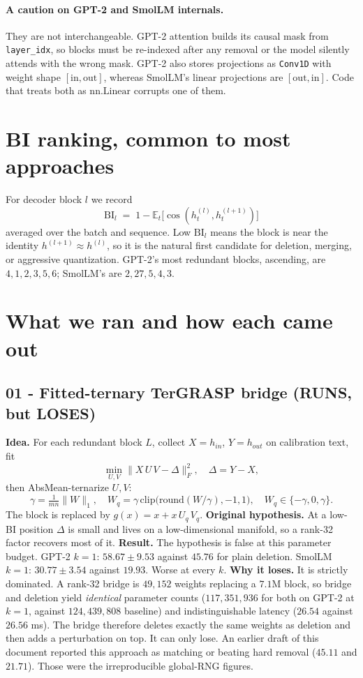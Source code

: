 \documentclass[11pt]{article}
\begin{document}
\paragraph{A caution on GPT-2 and SmolLM internals.} They are not
interchangeable. GPT-2 attention builds its causal mask from
\texttt{layer\_idx}, so blocks must be re-indexed after any removal or the
model silently attends with the wrong mask. GPT-2 also stores projections as
\texttt{Conv1D} with weight shape $[\text{in},\text{out}]$, whereas SmolLM's
linear projections are $[\text{out},\text{in}]$. Code that treats both as
$\mathrm{nn.Linear}$ corrupts one of them.

\section{BI ranking, common to most approaches} \label{sec:bi}
For decoder block $l$ we record
\[
\mathrm{BI}_l \;=\; 1 - \mathbb{E}_{t}\big[\cos(h^{(l)}_t, h^{(l+1)}_t)\big]
\]
averaged over the batch and sequence. Low $\mathrm{BI}_l$ means the block is
near the identity $h^{(l+1)}\approx h^{(l)}$, so it is the natural first
candidate for deletion, merging, or aggressive quantization. GPT-2's most
redundant blocks, ascending, are $4, 1, 2, 3, 5, 6$; SmolLM's are
$2, 27, 5, 4, 3$.

\section{What we ran and how each came out}

\subsection{01 - Fitted-ternary TerGRASP bridge (RUNS, but LOSES)}
\textbf{Idea.} For each redundant block $L$, collect $X=h_{in}$,
$Y=h_{out}$ on calibration text, fit
\[
\min_{U,V}\big\| X\,U\,V - \Delta \big\|_F^2,\quad \Delta = Y-X,
\]
then AbsMean-ternarize $U,V$:
\[
\gamma=\tfrac{1}{mn}\|W\|_1,\quad
W_q=\gamma\,\mathrm{clip}\!\big(\mathrm{round}(W/\gamma),-1,1\big),
\quad W_q\in\{-\gamma,0,\gamma\}.
\]
The block is replaced by $g(x)=x+x\,U_q\,V_q$.
\textbf{Original hypothesis.} At a low-BI position $\Delta$ is small and
lives on a low-dimensional manifold, so a rank-32 factor recovers most of it.
\textbf{Result.} The hypothesis is false at this parameter budget. GPT-2
$k{=}1$: $58.67\pm9.53$ against $45.76$ for plain deletion. SmolLM $k{=}1$:
$30.77\pm3.54$ against $19.93$. Worse at every $k$.
\textbf{Why it loses.} It is strictly dominated. A rank-32 bridge is $49{,}152$
weights replacing a $7.1$M block, so bridge and deletion yield
\emph{identical} parameter counts ($117{,}351{,}936$ for both on GPT-2 at
$k{=}1$, against $124{,}439{,}808$ baseline) and indistinguishable latency
($26.54$ against $26.56$ ms). The bridge therefore deletes exactly the same
weights as deletion and then adds a perturbation on top. It can only lose.
An earlier draft of this document reported this approach as matching or
beating hard removal ($45.11$ and $21.71$). Those were the irreproducible
global-RNG figures.
\end{document}
